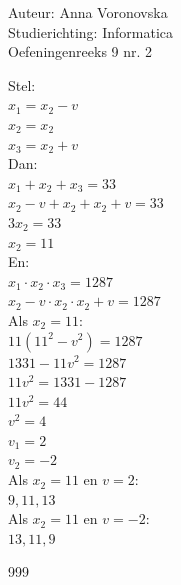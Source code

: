 \documentclass[a4paper]{article}
\begin{document}
  
\noindent \large Auteur: Anna Voronovska \\
\noindent \large Studierichting: Informatica\\
\noindent \large Oefeningenreeks 9 nr. 2\\

\medskip

\normalsize

Stel:\\

$x_1=x_2-v$\\

$x_2=x_2$\\

$x_3=x_2+v$\\

Dan:\\
 
$x_1+x_2+x_3=33$\\

$x_2-v+x_2+x_2+v=33$\\

$3x_2=33$\\

$x_2=11$\\

En:\\

$x_1 \cdot x_2 \cdot x_3=1287$\\

$x_2-v \cdot x_2 \cdot x_2 +v = 1287$\\

Als $x_2=11$:\\

$11(11^2 - v^2) = 1287$\\

$1331 - 11v^2=1287$\\

$11v^2=1331-1287$\\

$11v^2=44$\\

$v^2=4$\\

$v_1=2$\\

$v_2=-2$\\

Als $x_2=11$ en $v=2$:\\

$9, 11, 13$\\

Als $x_2=11$ en $v=-2$:\\

$13, 11, 9$


\begin{thebibliography}{999}
\end{thebibliography}
\end{document}
